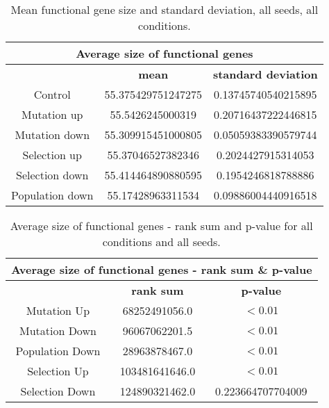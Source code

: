\begin{table}[H]
	\centering
	\begin{tabular}{|c|c|c|}
		\hline
		\multicolumn{3}{|c|}{\Large \textbf{Average size of functional genes}} \\
		\hline
		& \textbf{mean} & \textbf{standard deviation} \\
		\hline
		Control & 55.375429751247275 & 0.13745740540215895 \\
		\hline
		Mutation up & 55.5426245000319 & 0.20716437222446815\\ 
		\hline
		Mutation down & 55.309915451000805 & 0.05059383390579744 \\
		\hline
		Selection up & 55.37046527382346 & 0.2024427915314053 \\
		\hline
		Selection down & 55.414464890880595 & 0.1954246818788886 \\
		\hline
		Population down & 55.17428963311534	& 0.09886004440916518 \\
		\hline
	\end{tabular}
	\caption[Mean functional gene size and standard deviation]{Mean functional gene size and standard deviation, all seeds, all conditions.}
	\label{table:mean_functional_gene_size_and_std_dev}
\end{table}

\begin{table}[H]
	\begin{tabular}{|c|c|c|}
		\hline
		\multicolumn{3}{|c|}{\Large \textbf{Average size of functional genes - rank sum \& p-value}} \\
		\hline
		& \textbf{rank sum} & \textbf{p-value} \\
		\hline
		Mutation Up & 68252491056.0 & $ < 0.01$ \\
		\hline
		Mutation Down & 96067062201.5 & $ < 0.01$ \\
		\hline
		Population Down & 28963878467.0 & $ < 0.01$ \\
		\hline
		Selection Up & 103481641646.0 & $ < 0.01$ \\
		\hline
		Selection Down & 124890321462.0 & 0.223664707704009 \\
		\hline
	\end{tabular}
	\caption[Average size of functional genes - rank sum and p-value]{Average size of functional genes - rank sum and p-value for all conditions and all seeds.}
	\label{table:avg_size_of_functional_genes_rank_sum_and_p-value}
\end{table}

